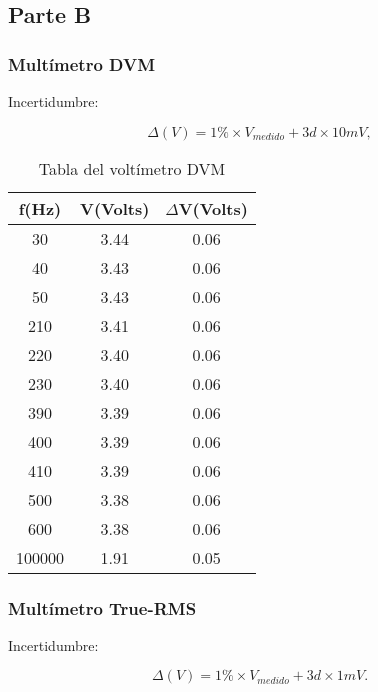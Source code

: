 \documentclass{article}
\begin{document}
\subsection{Parte B}

\subsubsection{Multímetro DVM}

Incertidumbre:

\begin{equation}
 	\Delta(V) = 1\%\times V_{medido} + 3d\times 10mV,
\end{equation}
\medskip


\begin{table}[!hbt]
	\begin{center}
	\begin{tabular}{|c|c|c|}\hline
	\textbf{f(Hz)} & \textbf{V(Volts)} & \textbf{$\Delta$V(Volts)} \\ \hline

	30 & 3.44 &  0.06	\\ \hline
    40 & 3.43 &	0.06\\ \hline
    50 & 3.43 &	0.06\\ \hline
	210 & 3.41 & 0.06\\ \hline
	220 & 3.40 & 0.06\\ \hline
	230 & 3.40 & 0.06\\ \hline
	390 & 3.39 & 0.06\\ \hline
	400 & 3.39 & 0.06\\ \hline
	410 & 3.39 & 0.06\\	 \hline
	500 & 3.38 & 0.06\\ \hline
	600 & 3.38 & 0.06\\ \hline
	100000 & 1.91 &	0.05\\ \hline
	\end{tabular}
	\caption{Tabla del voltímetro DVM}
	\end{center}
\end{table}
\bigskip


\subsubsection{Multímetro True-RMS}

Incertidumbre:

\begin{equation}
 	\Delta(V) = 1\%\times V_{medido} + 3d\times 1mV.
\end{equation}
\medskip
\end{document}
